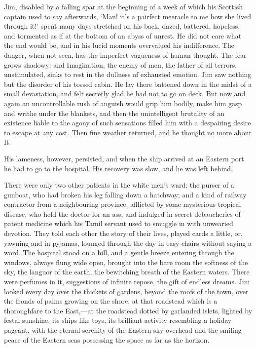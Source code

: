 Jim, disabled by a falling spar at the beginning of a week of which his Scottish captain used to say afterwards, ‘Man! it’s a pairfect meeracle to me how she lived through it!’ spent many days stretched on his back, dazed, battered, hopeless, and tormented as if at the bottom of an abyss of unrest. He did not care what the end would be, and in his lucid moments overvalued his indifference. The danger, when not seen, has the imperfect vagueness of human thought. The fear grows shadowy; and Imagination, the enemy of men, the father of all terrors, unstimulated, sinks to rest in the dullness of exhausted emotion. Jim saw nothing but the disorder of his tossed cabin. He lay there battened down in the midst of a small devastation, and felt secretly glad he had not to go on deck. But now and again an uncontrollable rush of anguish would grip him bodily, make him gasp and writhe under the blankets, and then the unintelligent brutality of an existence liable to the agony of such sensations filled him with a despairing desire to escape at any cost. Then fine weather returned, and he thought no more about It.

His lameness, however, persisted, and when the ship arrived at an Eastern port he had to go to the hospital. His recovery was slow, and he was left behind.

There were only two other patients in the white men’s ward: the purser of a gunboat, who had broken his leg falling down a hatchway; and a kind of railway contractor from a neighbouring province, afflicted by some mysterious tropical disease, who held the doctor for an ass, and indulged in secret debaucheries of patent medicine which his Tamil servant used to smuggle in with unwearied devotion. They told each other the story of their lives, played cards a little, or, yawning and in pyjamas, lounged through the day in easy-chairs without saying a word. The hospital stood on a hill, and a gentle breeze entering through the windows, always flung wide open, brought into the bare room the softness of the sky, the languor of the earth, the bewitching breath of the Eastern waters. There were perfumes in it, suggestions of infinite repose, the gift of endless dreams. Jim looked every day over the thickets of gardens, beyond the roofs of the town, over the fronds of palms growing on the shore, at that roadstead which is a thoroughfare to the East,—at the roadstead dotted by garlanded islets, lighted by festal sunshine, its ships like toys, its brilliant activity resembling a holiday pageant, with the eternal serenity of the Eastern sky overhead and the smiling peace of the Eastern seas possessing the space as far as the horizon.

